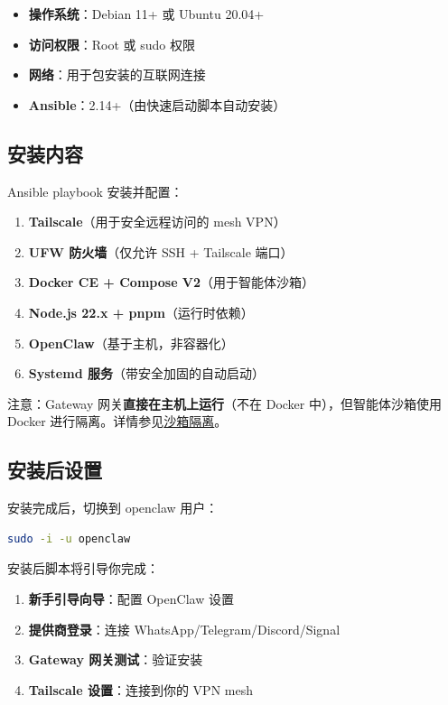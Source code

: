 \begin{itemize}
  \item \textbf{操作系统}：Debian 11+ 或 Ubuntu 20.04+
  \item \textbf{访问权限}：Root 或 sudo 权限
  \item \textbf{网络}：用于包安装的互联网连接
  \item \textbf{Ansible}：2.14+（由快速启动脚本自动安装）
\end{itemize}


\subsection{安装内容}


Ansible playbook 安装并配置：

\begin{enumerate}
  \item \textbf{Tailscale}（用于安全远程访问的 mesh VPN）
  \item \textbf{UFW 防火墙}（仅允许 SSH + Tailscale 端口）
  \item \textbf{Docker CE + Compose V2}（用于智能体沙箱）
  \item \textbf{Node.js 22.x + pnpm}（运行时依赖）
  \item \textbf{OpenClaw}（基于主机，非容器化）
  \item \textbf{Systemd 服务}（带安全加固的自动启动）
\end{enumerate}


注意：Gateway 网关\textbf{直接在主机上运行}（不在 Docker 中），但智能体沙箱使用 Docker 进行隔离。详情参见\href{/gateway/sandboxing}{沙箱隔离}。

\subsection{安装后设置}


安装完成后，切换到 openclaw 用户：

\begin{lstlisting}[language=bash]
sudo -i -u openclaw
\end{lstlisting}


安装后脚本将引导你完成：

\begin{enumerate}
  \item \textbf{新手引导向导}：配置 OpenClaw 设置
  \item \textbf{提供商登录}：连接 WhatsApp/Telegram/Discord/Signal
  \item \textbf{Gateway 网关测试}：验证安装
  \item \textbf{Tailscale 设置}：连接到你的 VPN mesh
\end{enumerate}


